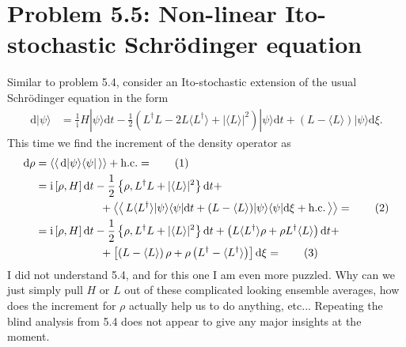 \documentclass[english, parskip=full]{scrartcl}
\newcommand\numberthis{\addtocounter{equation}{1}\tag{\theequation}}
\newcommand{\bra}{}
\newcommand{\kla}{}
\newcommand{\klam}{}
\newcommand{\klammer}{}
\newcommand{\oper}{}
\newcommand{\tecxt}{}
\newcommand{\Ket}{}
\renewcommand{\i}{\text{i}}
\begin{document}
\section*{Problem 5.5: Non-linear Ito-stochastic Schrödinger equation}
Similar to problem 5.4, consider an Ito-stochastic extension of the usual Schrödinger equation in the form
\begin{align}
\tecxt\text{d}\Ket | {\psi} \rangle &= \frac{1}{\i} H\Ket | {\psi} \rangle \tecxt\text{d}t - \frac{1}{2}  \kla\left( {L^\dagger L - 2L \bra\langle {L^\dagger}\rangle + |\bra\langle {L}\rangle|^2} \right) \Ket | {\psi} \rangle \tecxt\text{d}t + (L-\bra\langle {L}\rangle )\Ket | {\psi} \rangle \tecxt\text{d}\xi.
\end{align}
This time we find the increment of the density operator as
\begin{align*}
\tecxt\text{d}\rho &= \left\langle\left\langle\,  \tecxt\text{d}\oper | {\psi} \rangle  \langle {\psi} | \,\right\rangle\right\rangle + \tecxt\text{h.c.}  = \numberthis \\
&= \i\klam\left[ {\rho, H} \right]\tecxt\text{d}t - \frac{1}{2}\klammer\left\{{\rho, L^\dagger L + |\bra\langle {L}\rangle|^2 } \right\} \tecxt\text{d}t +\\
&\hspace{2.05cm} + \left\langle\left\langle\, L \bra\langle {L^\dagger}\rangle | {\psi} \rangle  \langle {\psi} |  \tecxt\text{d}t + (L-\bra\langle {L}\rangle ) | {\psi} \rangle  \langle {\psi} | \tecxt\text{d}\xi + \tecxt\text{h.c.}  \,\right\rangle\right\rangle = \numberthis \\
&= \i\klam\left[ {\rho, H} \right]\tecxt\text{d}t - \frac{1}{2}\klammer\left\{{\rho, L^\dagger L + |\bra\langle {L}\rangle|^2 } \right\} \tecxt\text{d}t + \kla\left( {L\bra\langle {L^\dagger}\rangle\rho + \rho L^\dagger \bra\langle {L}\rangle } \right) \tecxt\text{d}t + \\
&\hspace{2.05cm} + \klam\left[ {\kla\left( {L - \bra\langle {L}\rangle } \right)\rho + \rho \kla\left( {L^\dagger - \bra\langle {L^\dagger}\rangle } \right) } \right] \tecxt\text{d}\xi =  \numberthis  
\end{align*}
I did not understand 5.4, and for this one I am even more puzzled. 
Why can we just simply pull $H$ or $L$ out of these complicated looking ensemble averages, how does the increment for $\rho$ actually help us to do anything, etc... 
Repeating the blind analysis from 5.4 does not appear to give any major insights at the moment.


\end{document}
